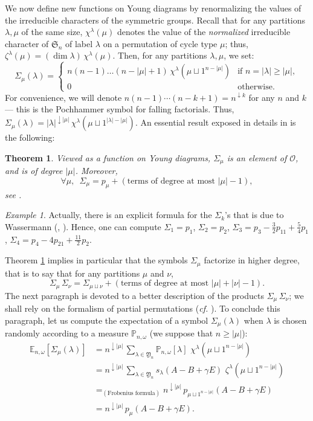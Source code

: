 \documentclass[smallextended,nospthms]{svjour3}
\newtheorem{theorem}{Theorem}
\theoremstyle{remark}
\newtheorem*{example}{Example}
\newcommand{\sym}{\mathfrak{S}}
\newcommand{\ym}{\mathfrak{Y}}
\newcommand{\proba}{\mathbb{P}}
\newcommand{\esper}{\mathbb{E}}
\newcommand{\obs}{\mathscr{O}}
\begin{document}
We now define new functions on Young diagrams by renormalizing the values of the irreducible characters of the symmetric groups. Recall that for any partitions $\lambda,\mu$ of the same size, $\chi^{\lambda}(\mu)$ denotes the value of the \emph{normalized} irreducible character of $\sym_{n}$ of label $\lambda$ on a permutation of cycle type $\mu$; thus, $\zeta^{\lambda}(\mu)=(\dim \lambda)\,\chi^{\lambda}(\mu)$. Then, for any partitions $\lambda,\mu$, we set:
$$\varSigma_{\mu}(\lambda)=\begin{cases}
n(n-1)\ldots (n-|\mu|+1)\,\chi^{\lambda}(\mu \sqcup 1^{n-|\mu|}) &\text{if }n=|\lambda|\geq |\mu|,\\
0&\text{otherwise}.
\end{cases}$$
For convenience, we will denote $n(n-1)\cdots (n-k+1)=n^{\downarrow k}$ for any $n$ and $k$ --- this is the Pochhammer symbol for falling factorials. Thus, $\varSigma_{\mu}(\lambda)=|\lambda|^{\downarrow |\mu|}\,\chi^{\lambda}(\mu \sqcup 1^{|\lambda|-|\mu|})$. An essential result exposed in details in \cite{IO02} is the following:
\begin{theorem}\label{ivanovolshanski}
Viewed as a function on Young diagrams, $\varSigma_{\mu}$ is an element of $\obs$, and is of degree $|\mu|$. Moreover,
$$\forall \mu,\,\,\,\varSigma_{\mu}=p_{\mu}+(\text{terms of degree at most } |\mu|-1),$$
see \cite[Proposition 3.4]{IO02}.
\end{theorem}
\begin{example}
Actually, there is an explicit formula for the $\varSigma_{k}$'s that is due to Wassermann (\cite{Was81}, \cite[Proposition 3.3]{IO02}). Hence, one can compute $\varSigma_{1}=p_{1}$, $\varSigma_{2}=p_{2}$, $\varSigma_{3}=p_{3}-\frac{3}{2}p_{11}+\frac{5}{4}p_{1}$, $\varSigma_{4}=p_{4}-4p_{21}+\frac{11}{2}p_{2}$.
\end{example}
\noindent Theorem \ref{ivanovolshanski} implies in particular that the symbols $\varSigma_{\mu}$ factorize in higher degree, that is to say that for any partitions $\mu$ and $\nu$,
$$\varSigma_{\mu}\,\varSigma_{\nu}=\varSigma_{\mu \sqcup \nu}+(\text{terms of degree at most }|\mu|+|\nu|-1).$$
The next paragraph is devoted to a better description of the products $\varSigma_{\mu}\,\varSigma_{\nu}$; we shall rely on the formalism of partial permutations (\emph{cf.} \cite{IK99}). To conclude this paragraph, let us compute the expectation of a symbol $\varSigma_{\mu}(\lambda)$ when $\lambda$ is chosen randomly according to a measure $\proba_{n,\omega}$ (we suppose that $n \geq |\mu|$):
\begin{align*}\esper_{n,\omega}[\varSigma_{\mu}(\lambda)]&=n^{\downarrow |\mu|} \, \sum_{\lambda \in \ym_{n}} \proba_{n,\omega}[\lambda]\,\,\chi^{\lambda}(\mu \sqcup 1^{n-|\mu|})\\
&=n^{\downarrow |\mu|} \, \sum_{\lambda \in \ym_{n}} s_{\lambda}(A-B+\gamma E)\,\,\zeta^{\lambda}(\mu \sqcup 1^{n-|\mu|})\\
&=_{(\text{Frobenius formula})}n^{\downarrow |\mu|}\,p_{\mu \sqcup 1^{n-|\mu|}}(A-B+\gamma E)\\
&=n^{\downarrow |\mu|}\,p_{\mu}(A-B+\gamma E).\end{align*}
\end{document}
